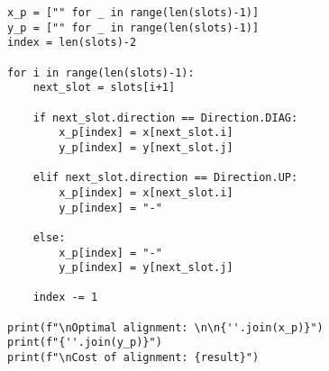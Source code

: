 \documentclass{article}
\renewcommand{\_}{\ifincsname_\else\legacyunderscore\fi}
\begin{document}
\begin{lstlisting}
x_p = ["" for _ in range(len(slots)-1)]
y_p = ["" for _ in range(len(slots)-1)]
index = len(slots)-2

for i in range(len(slots)-1):
    next_slot = slots[i+1]
    
    if next_slot.direction == Direction.DIAG:
        x_p[index] = x[next_slot.i]
        y_p[index] = y[next_slot.j]

    elif next_slot.direction == Direction.UP:
        x_p[index] = x[next_slot.i]
        y_p[index] = "-"

    else:
        x_p[index] = "-"
        y_p[index] = y[next_slot.j]

    index -= 1

print(f"\nOptimal alignment: \n\n{''.join(x_p)}")
print(f"{''.join(y_p)}")
print(f"\nCost of alignment: {result}")

\end{lstlisting}
    \printbibliography
\end{document}
